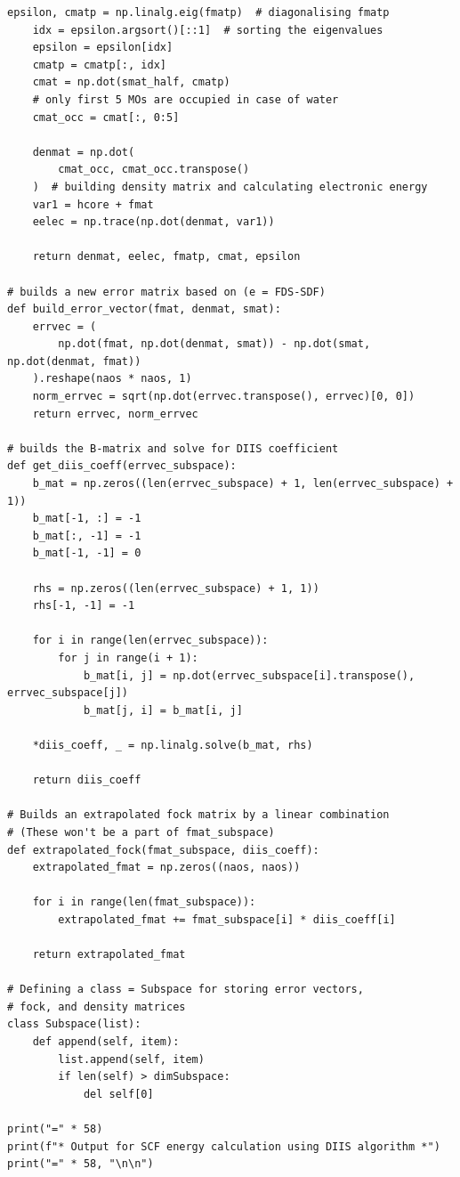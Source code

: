 \begin{lstlisting}[style=MyPython]
    epsilon, cmatp = np.linalg.eig(fmatp)  # diagonalising fmatp
    idx = epsilon.argsort()[::1]  # sorting the eigenvalues
    epsilon = epsilon[idx]
    cmatp = cmatp[:, idx]
    cmat = np.dot(smat_half, cmatp)
    # only first 5 MOs are occupied in case of water
    cmat_occ = cmat[:, 0:5]

    denmat = np.dot(
        cmat_occ, cmat_occ.transpose()
    )  # building density matrix and calculating electronic energy
    var1 = hcore + fmat
    eelec = np.trace(np.dot(denmat, var1))

    return denmat, eelec, fmatp, cmat, epsilon

# builds a new error matrix based on (e = FDS-SDF)
def build_error_vector(fmat, denmat, smat):
    errvec = (
        np.dot(fmat, np.dot(denmat, smat)) - np.dot(smat, np.dot(denmat, fmat))
    ).reshape(naos * naos, 1)
    norm_errvec = sqrt(np.dot(errvec.transpose(), errvec)[0, 0])
    return errvec, norm_errvec

# builds the B-matrix and solve for DIIS coefficient
def get_diis_coeff(errvec_subspace):
    b_mat = np.zeros((len(errvec_subspace) + 1, len(errvec_subspace) + 1))
    b_mat[-1, :] = -1
    b_mat[:, -1] = -1
    b_mat[-1, -1] = 0

    rhs = np.zeros((len(errvec_subspace) + 1, 1))
    rhs[-1, -1] = -1

    for i in range(len(errvec_subspace)):
        for j in range(i + 1):
            b_mat[i, j] = np.dot(errvec_subspace[i].transpose(), errvec_subspace[j])
            b_mat[j, i] = b_mat[i, j]

    *diis_coeff, _ = np.linalg.solve(b_mat, rhs)

    return diis_coeff

# Builds an extrapolated fock matrix by a linear combination
# (These won't be a part of fmat_subspace)
def extrapolated_fock(fmat_subspace, diis_coeff):
    extrapolated_fmat = np.zeros((naos, naos))

    for i in range(len(fmat_subspace)):
        extrapolated_fmat += fmat_subspace[i] * diis_coeff[i]

    return extrapolated_fmat

# Defining a class = Subspace for storing error vectors,
# fock, and density matrices
class Subspace(list):
    def append(self, item):
        list.append(self, item)
        if len(self) > dimSubspace:
            del self[0]

print("=" * 58)
print(f"* Output for SCF energy calculation using DIIS algorithm *")
print("=" * 58, "\n\n")


\end{lstlisting}
